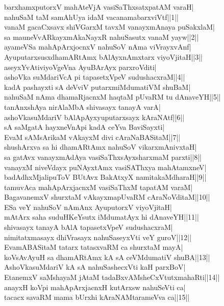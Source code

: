 \documentclass{article}
\begin{document}
barxhamxputorxV mahAteVjA vasiSaThxsatxpatAM varaH|\\
nahuSaM taM samAhUya idaM vacanamabarxviVtf||1||\\
vanaM gacaCxsavx shiVGarxM tavxM vanayxmAnaya puSakxlaM|\\
sa mauneVvARkayxmAkaNayxR nahuSasutx vanaM yayw||2||\\
ayameVSa mahApArxjocnxV nahuSoV nAma viVrayxvAnf|\\
AyuputarxsusxdhamARtAmx bAlAyxnAmxtarx viyoVjitaH||3||\\
aseyxYvAtiviyoVgeVna AyuBArAyx parxroVditi|\\
ashoVka suMdariVcA pi tapasetxVpeV sudushacxraM||4||\\
kadA pashayxti sA deVviV putarxmiMdumatiVM shuBaM|\\
nahuSaM nAma dhamaRjacnxM haqtaM pUvaRM tu dAnaveYH||5||\\
tanAnxshAya nirAlaMbA shivasayx tanayA varA|\\
ashoVkasuMdariV bAlApAyxyuputarxsayx kAraNAtf||6||\\
sA saMgatA hayxneVnApi kadA ceYva BaviSayxti|\\
EvaM sAMsArikaM vAkayxM divi cAraNaBASitaM||7||\\
shushArxva sa hi dhamARtAmx nahuSoV vikarxmAnivxtaH|\\
sa gatAvx vanayxmAdAya vasiSaThxsAyxsharxmaM parxti||8||\\
vanayxM niveVdayx puNAyxtAmx vasiSAThxya mahAtamxneV|\\
badAdhxMjalipuToV BUtAvx BakAtxyX namitakaMdharaH||9||\\
tamuvAca mahApArxjacnxM vasiSaThxM tapatAM varaM|\\
BagavanemxV shurxtaM vAkayxmapUvaRM cAraNoVditaM||10||\\
ESa veY  nahuSoV nAmAnx AyuputorxV viyoVjitaH|\\
mAtArx saha suduHKeYsutx iMdumatAyx hi dAnaveYH||11||\\
shivasayx tanayA bAlA tapasetxVpeV sudushacxraM|\\
nimitatxmasayx dhiVrasayx nahuSaseyxVti veY guroV||12||\\
EvamABASitaM tatarx tatasxvaRM ca shurxtaM mayA|\\
koVsAvAyuH sa dhamARtAmx kA sA ceVMdumatiV shuBA||13||\\
AshoVkasuMdariV kA sA nahuSashecxVti kaH parxBoV|\\
EtanemxV saMshayaM jAtaM tadaBxvAMsheCxVtutxmahaRti||14||\\
anayxH koVpi mahApArxjacnxH kutArxsw nahuSeVti ca|\\
tacacx savaRM   mama bUrxhi kAraNAMtarameVva ca||15||\\
\end{document}
